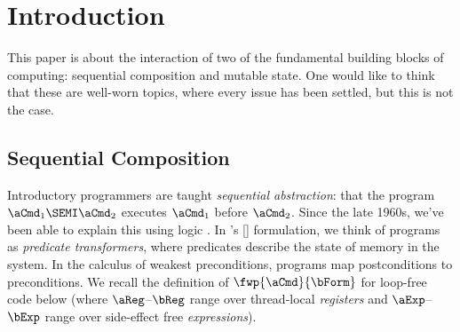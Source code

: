 \section{Introduction}
\label{sec:intro}

This paper is about the interaction of two of the fundamental building blocks
of computing: sequential composition and mutable state. One would like to
think that these are well-worn topics, where every issue has been settled,
but this is not the case.

\subsection{Sequential Composition} %

Introductory programmers are taught \emph{sequential abstraction}: that the
program $\aCmd_1\SEMI \aCmd_2$ executes $\aCmd_1$ before $\aCmd_2$.  Since
the late 1960s, we've been able to explain this using logic
\citep{Hoare:1969:ABC:363235.363259}.  In
\citeauthor{DBLP:journals/cacm/Dijkstra75}'s
[\citeyear{DBLP:journals/cacm/Dijkstra75}] formulation, we think of programs
as \emph{predicate transformers}, where predicates describe the state of
memory in the system.  In the calculus of weakest preconditions, programs map
postconditions to preconditions.  We recall the definition of
$\fwp{\aCmd}{\bForm}$ for loop-free code below (where $\aReg$--$\bReg$ range over thread-local \emph{registers}
and $\aExp$--$\bExp$ range over side-effect free \emph{expressions}). 
